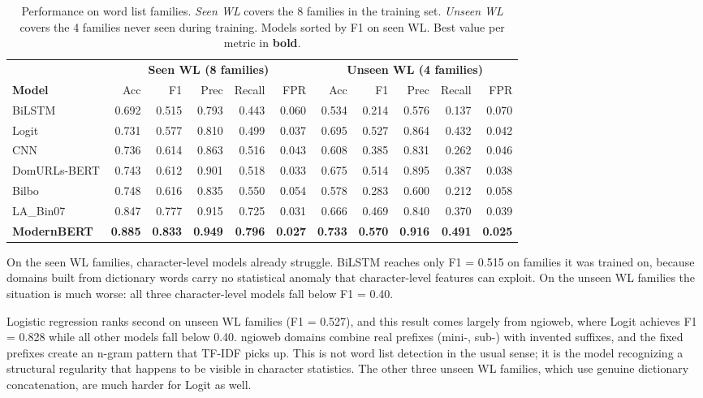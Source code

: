 \documentclass[conference]{IEEEtran}
\begin{document}
\begin{table}[!t]
\caption{Performance on word list families. \textit{Seen WL} covers the 8 families in the training set. \textit{Unseen WL} covers the 4 families never seen during training. Models sorted by F1 on seen WL. Best value per metric in \textbf{bold}.}
\label{tab:wordlist}
\centering
\renewcommand{\arraystretch}{1.1}
\begin{tabular}{lrrrrrrrrrr}
\toprule
& \multicolumn{5}{c}{\textbf{Seen WL (8 families)}} & \multicolumn{5}{c}{\textbf{Unseen WL (4 families)}} \\
\cmidrule(lr){2-6}\cmidrule(lr){7-11}
\textbf{Model} & Acc & F1 & Prec & Recall & FPR & Acc & F1 & Prec & Recall & FPR \\
\midrule
BiLSTM & 0.692 & 0.515 & 0.793 & 0.443 & 0.060 & 0.534 & 0.214 & 0.576 & 0.137 & 0.070 \\
Logit & 0.731 & 0.577 & 0.810 & 0.499 & 0.037 & 0.695 & 0.527 & 0.864 & 0.432 & 0.042 \\
CNN & 0.736 & 0.614 & 0.863 & 0.516 & 0.043 & 0.608 & 0.385 & 0.831 & 0.262 & 0.046 \\
DomURLs-BERT & 0.743 & 0.612 & 0.901 & 0.518 & 0.033 & 0.675 & 0.514 & 0.895 & 0.387 & 0.038 \\
Bilbo & 0.748 & 0.616 & 0.835 & 0.550 & 0.054 & 0.578 & 0.283 & 0.600 & 0.212 & 0.058 \\
LA\_Bin07 & 0.847 & 0.777 & 0.915 & 0.725 & 0.031 & 0.666 & 0.469 & 0.840 & 0.370 & 0.039 \\
\textbf{ModernBERT} & \textbf{0.885} & \textbf{0.833} & \textbf{0.949} & \textbf{0.796} & \textbf{0.027} & \textbf{0.733} & \textbf{0.570} & \textbf{0.916} & \textbf{0.491} & \textbf{0.025} \\
\bottomrule
\end{tabular}
\end{table}

On the seen WL families, character-level models already struggle. BiLSTM reaches only F1 = 0.515 on families it was trained on, because domains built from dictionary words carry no statistical anomaly that character-level features can exploit. On the unseen WL families the situation is much worse: all three character-level models fall below F1 = 0.40.

Logistic regression ranks second on unseen WL families (F1 = 0.527), and this result comes largely from ngioweb, where Logit achieves F1 = 0.828 while all other models fall below 0.40. ngioweb domains combine real prefixes (mini-, sub-) with invented suffixes, and the fixed prefixes create an n-gram pattern that TF-IDF picks up. This is not word list detection in the usual sense; it is the model recognizing a structural regularity that happens to be visible in character statistics. The other three unseen WL families, which use genuine dictionary concatenation, are much harder for Logit as well.
\end{document}
